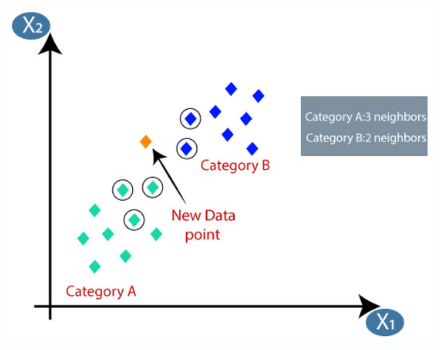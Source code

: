 \begin{figure}
    \begin{center}    
        \includegraphics[width=0.9\linewidth]{images/image11.jpeg}
    \end{center}
\end{figure}

